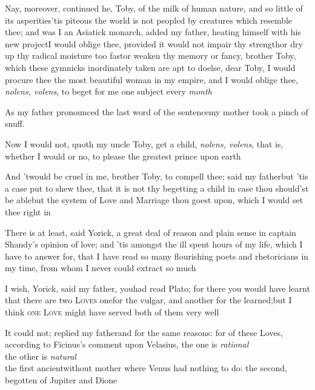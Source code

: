 \documentclass{article}
\begin{document}
\tsh Nay, moreover, continued he,\break
{}
\pb
Toby, of the milk of human nature, and so little of
its asperities\tsk ’tis piteous the world is not peopled by creatures which resemble
thee; and was I an Asia\-tick monarch, added my father, heating himself with his new
project\tsk I would oblige thee, provided it would not impair thy strength\tsk or dry up
thy radical moisture too fast\tsk or weaken thy memory or fancy, brother Toby, which
these gymnicks inordinately taken are apt to do\tsk else, dear Toby, I would procure
thee the most beautiful woman in my empire, and I would oblige thee, \textit{nolens,
volens}, to beget for me one subject every \textit{month}\tsh

As my father pronounced the last word of the sentence\tsk my
mother took a pinch of snuff.

\newpage
Now I would not, quoth my uncle Toby, get a child,
\textit{nolens, volens}, that is, whether I would or no, to please
the greatest prince upon earth\tsh

\tsh And ’twould be cruel in me, brother
Toby, to compell thee; said my father\tsk but ’tis a
case put to shew thee, that it is not thy begetting a
child\break
\tsk in case thou should’st be able\tsk but the
system of Love and Marriage thou goest upon, which I would set thee
right in\tsh

There is at least, said Yorick, a great deal of reason
and plain sense in captain Shandy’s opinion of love;
and ’tis amongst the ill spent hours of my life, which I have
to answer for, that I have read so many flourishing poets and
rhetoricians in my time, from whom I never could
extract so much\tsh

\newpage
I wish, Yorick, said my father, you\break had read
Plato; for there you would have learnt that there are two
\textsc{Loves}\tsk\break 
{}
one\tsk for the vulgar, and another for the
learned;\tsk but I think \textsc{one Love}
might have served both of them very well\tsk 

It could not; replied my father\tsk and for the same reasons:
for of these Loves, according to Ficinus’s comment
upon Velasius, the one is \textit{rational}\tsh\\
\null\quad\tsh the other is \textit{natural}\tsh \\
the first ancient\tsh without mother \tsh\break where
Venus had nothing to do: the second, begotten of
Jupiter and Dione\tsk
\end{document}

